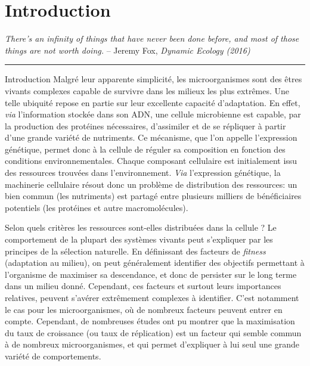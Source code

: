 \chapter{Introduction}
\label{chap:introduction}

\textit{There's an infinity of things that have never been done before, and most of those things are not worth doing.} -- Jeremy Fox, \textit{Dynamic Ecology (2016)}~\cite{fox_how_2016}

\begin{center}
\noindent\rule{4cm}{0.1pt}
\end{center}

\begin{chapter_summary}{Introduction}
Malgré leur apparente simplicité, les microorganismes sont des êtres vivants complexes capable de survivre dans les milieux les plus extrêmes.
Une telle ubiquité repose en partie sur leur excellente capacité d'adaptation.
En effet, \textit{via} l'information stockée dans son ADN, une cellule microbienne est capable, par la production des protéines nécessaires, d'assimiler et de se répliquer à partir d'une grande variété de nutriments.
Ce mécanisme, que l'on appelle l'expression génétique, permet donc à la cellule de réguler sa composition en fonction des conditions environnementales.
Chaque composant cellulaire est initialement issu des ressources trouvées dans l'environnement.
\textit{Via} l'expression génétique, la machinerie cellulaire résout donc un problème de distribution des ressources: un bien commun (les nutriments) est partagé entre plusieurs milliers de bénéficiaires potentiels (les protéines et autre macromolécules).

Selon quels critères les ressources sont-elles distribuées dans la cellule ?
Le comportement de la plupart des systèmes vivants peut s'expliquer par les principes de la sélection naturelle.
En définissant des facteurs de \textit{fitness} (adaptation au milieu), on peut généralement identifier des objectifs permettant à l'organisme de maximiser sa descendance, et donc de persister sur le long terme dans un milieu donné.
Cependant, ces facteurs et surtout leurs importances relatives, peuvent s'avérer extrêmement complexes à identifier.
C'est notamment le cas pour les microorganismes, où de nombreux facteurs peuvent entrer en compte.
Cependant, de nombreuses études ont pu montrer que la maximisation du taux de croissance (ou taux de réplication) est un facteur qui semble commun à de nombreux microorganismes, et qui permet d'expliquer à lui seul une grande variété de comportements.


\end{chapter_summary}
